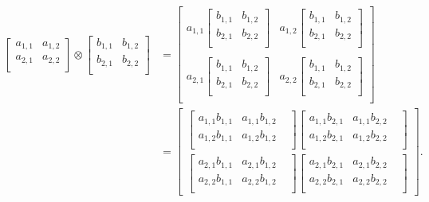 \begin{equation}
\begin{aligned}
\begin{bmatrix}
 a_{1,1} & a_{1,2} \\
 a_{2,1} & a_{2,2} \\
 \end{bmatrix}
\otimes
 \begin{bmatrix}
 b_{1,1} & b_{1,2} \\
 b_{2,1} & b_{2,2} \\
 \end{bmatrix}
&=
 \begin{bmatrix}
 a_{1,1} \begin{bmatrix}
 b_{1,1} & b_{1,2} \\
 b_{2,1} & b_{2,2} \\
 \end{bmatrix} & a_{1,2} \begin{bmatrix}
 b_{1,1} & b_{1,2} \\
 b_{2,1} & b_{2,2} \\
 \end{bmatrix} \\
 & \\
 a_{2,1} \begin{bmatrix}
 b_{1,1} & b_{1,2} \\
 b_{2,1} & b_{2,2} \\
 \end{bmatrix} & a_{2,2} \begin{bmatrix}
 b_{1,1} & b_{1,2} \\
 b_{2,1} & b_{2,2} \\
 \end{bmatrix} \\
 \end{bmatrix} \\
&=
 \begin{bmatrix}
  \begin{bmatrix}
 a_{1,1} b_{1,1} & a_{1,1} b_{1,2} & \\ a_{1,2} b_{1,1} & a_{1,2} b_{1,2} \\
  \end{bmatrix}
  \begin{bmatrix}
 a_{1,1} b_{2,1} & a_{1,1} b_{2,2} & \\ a_{1,2} b_{2,1} & a_{1,2} b_{2,2} \\
  \end{bmatrix} \\
  \begin{bmatrix}
 a_{2,1} b_{1,1} & a_{2,1} b_{1,2} & \\ a_{2,2} b_{1,1} & a_{2,2} b_{1,2} \\
  \end{bmatrix}
  \begin{bmatrix}
 a_{2,1} b_{2,1} & a_{2,1} b_{2,2} & \\ a_{2,2} b_{2,1} & a_{2,2} b_{2,2} \\
 \end{bmatrix}
 \end{bmatrix}.
\end{aligned}
\end{equation}
